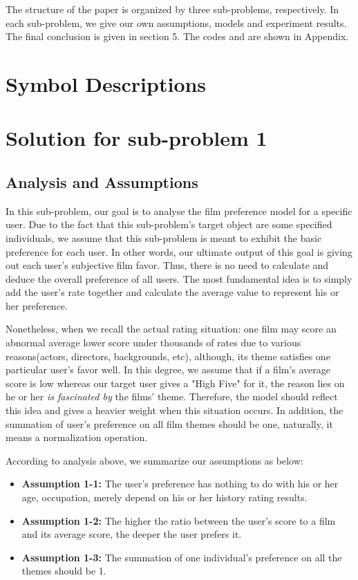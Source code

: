 The structure of the paper is organized by three sub-problems, respectively. In each sub-problem, we give our own assumptions, models and experiment results. The final conclusion is given in section 5. The codes and are shown in Appendix. 

\section{Symbol Descriptions}
\section{Solution for sub-problem 1}
\subsection{Analysis and Assumptions}
In this sub-problem, our goal is to analyse the film preference model for a specific user. Due to the fact that this sub-problem's target object are some specified individuals, we assume that this sub-problem is meant to exhibit the basic preference for each user. In other words, our ultimate output of this goal is giving out each user's subjective film favor. Thus, there is no need to calculate and deduce the overall preference of all users. The most fundamental idea is to simply add the user's rate together and calculate the average value to represent his or her preference. 

Nonetheless, when we recall the actual rating situation: one film may score an abnormal average lower score under thousands of rates due to various reasons(actors, directors, backgrounds, etc), although, its theme satisfies one particular user's favor well. In this degree, we assume that if a film's average score is low whereas our target user gives a "High Five" for it, the reason lies on he or her \textit{is fascinated by} the films' theme. Therefore, the model should reflect this idea and gives a heavier weight when this situation occurs. In addition, the summation of user's preference on all film themes should be one, naturally, it means a normalization operation. 

According to analysis above, we summarize our assumptions as below:
\begin{itemize}
\item \textbf{Assumption 1-1:} The user's preference has nothing to do with his or her age, occupation, merely depend on his or her history rating results.

\item \textbf{Assumption 1-2:} The higher the ratio between the user's score to a film and its average score, the deeper the user prefers it.

\item\textbf{Assumption 1-3:} The summation of one individual's preference on all the themes should be 1.
\end{itemize} 

